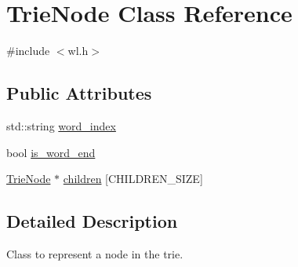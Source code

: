 \hypertarget{classTrieNode}{\section{Trie\-Node Class Reference}
\label{classTrieNode}
}


{\ttfamily \#include $<$wl.\-h$>$}

\subsection*{Public Attributes}
\begin{DoxyCompactItemize}
\item 
std\-::string \hyperlink{classTrieNode_a47dd439e1e4db41bb42fa8d3c696cdae}{word\-\_\-index}
\item 
bool \hyperlink{classTrieNode_a14983627e54ef24a0963d2836755dcaf}{is\-\_\-word\-\_\-end}
\item 
\hyperlink{classTrieNode}{Trie\-Node} $\ast$ \hyperlink{classTrieNode_a69ae75c32241f3f6b49f3aad6e6fb6f2}{children} \mbox{[}C\-H\-I\-L\-D\-R\-E\-N\-\_\-\-S\-I\-Z\-E\mbox{]}
\end{DoxyCompactItemize}


\subsection{Detailed Description}
Class to represent a node in the trie. 

